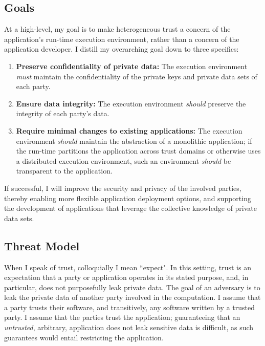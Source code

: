 

\subsection{Goals}
At a high-level, my goal is to make heterogeneous trust a concern
of the application's run-time execution environment, rather than a concern of
the application developer.
%
I distill my overarching goal down to three specifics:

\begin{enumerate}
\item \textbf{Preserve confidentiality of private data:}
    The execution environment \emph{must} maintain the confidentiality of the
    private keys and private data sets of each party.

\item \textbf{Ensure data integrity:} 
    The execution environment \emph{should} preserve the integrity of each
    party's data.

\item \textbf{Require minimal changes to existing applications:}
    The execution environment \emph{should} maintain the abstraction of a
    monolithic application; if the run-time partitions the application
    across trust domains or otherwise uses a distributed execution
    environment, such an environment \emph{should} be transparent to the
    application.
\end{enumerate}

If successful, I will improve the security and privacy of the involved parties,
thereby enabling more flexible application deployment options, and supporting
the development of applications that leverage the collective knowledge of
private data sets.


\subsection{Threat Model}

When I speak of trust, colloquially I  mean ``expect". 
%
In this setting, trust is an expectation that a party or application operates in
its stated purpose, and, in particular, does not purposefully leak private
data.
%
The goal of an adversary is to leak the private data of another party involved
in the computation.
%
I assume that a party trusts their software, and transitively, any software
written by a trusted party.
%
I assume that the parties trust the application; guaranteeing that an
\emph{untrusted}, arbitrary, application does not leak sensitive data is
difficult, as such guarantees would entail restricting the application.


